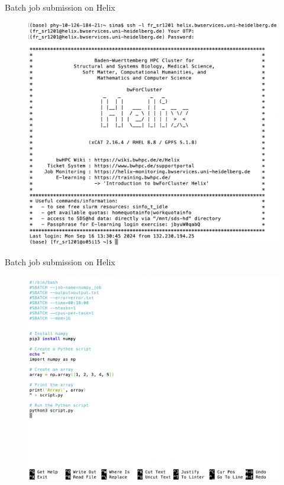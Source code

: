 \documentclass{beamer}
\begin{document}
\begin{frame}{Batch job submission on Helix}

\begin{figure}
    \centering
    \includegraphics[width=0.85\linewidth]{examples/ScreenShots/S1.png}
\end{figure}

\end{frame}

\begin{frame}{Batch job submission on Helix}

\begin{figure}
    \centering
    \includegraphics[width=0.85\linewidth]{examples/ScreenShots/S2.png}
\end{figure}

\end{frame}
\end{document}
